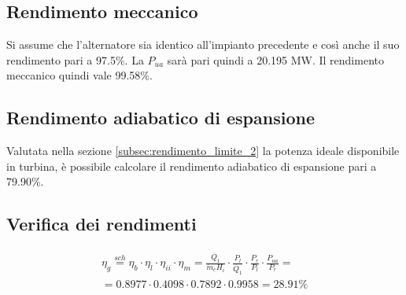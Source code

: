 \subsection{Rendimento meccanico}
Si assume che l'alternatore sia identico all'impianto precedente e così anche il suo rendimento pari a 97.5\%.
La $P_{ua}$ sarà pari quindi a 20.195 MW. Il rendimento meccanico quindi vale 99.58\%.

\subsection{Rendimento adiabatico di espansione}
Valutata nella sezione \ref{subsec:rendimento_limite_2} la potenza ideale disponibile in turbina, è possibile calcolare il rendimento adiabatico di espansione pari a
79.90\%.

\subsection{Verifica dei rendimenti}
\begin{align*}
    \eta_g \stackrel{sch}{=} \eta_b \cdot \eta_l \cdot \eta_{ii} \cdot \eta_m
    = \frac{\dot{Q_1}}{\dot{m}_c H_i}\cdot \frac{P_l}{\dot{Q_1}} \cdot \frac{P_r}{P_l}\cdot \frac{P_{ua}}{P_r} = \\
    =  0.8977 \cdot 0.4098 \cdot 0.7892 \cdot 0.9958 = 28.91 \%
\end{align*}
